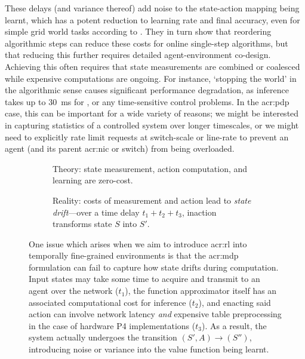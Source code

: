 These delays (and variance thereof) add noise to the state-action mapping being learnt, which has a potent reduction to learning rate and final accuracy, even for simple grid world tasks according to \textcite{DBLP:journals/firai/TravnikMSP18}.
They in turn show that reordering algorithmic steps can reduce these costs for online single-step algorithms, but that reducing this further requires detailed agent-environment co-design.
Achieving this often requires that state measurements are combined or coalesced~\parencite{DBLP:journals/corr/abs-1910-04054,DBLP:journals/tnsm/SimpsonRP20} while expensive computations are ongoing.
For instance, `stopping the world' in the algorithmic sense causes significant performance degradation, as inference takes up to \SI{30}{\milli\second} for \citeauthor{DBLP:journals/corr/abs-1910-04054}, or any time-sensitive control problems.
In the \gls{acr:pdp} case, this can be important for a wide variety of reasons; we might be interested in capturing statistics of a controlled system over longer timescales, or we might need to explicitly rate limit requests at switch-scale or line-rate to prevent an agent (and its parent \gls{acr:nic} or switch) from being overloaded.

\begin{figure}
	\begin{subfigure}{0.45\linewidth}
		\centering
		\resizebox{0.975\linewidth}{!}{\hspace{-0.5em}}
		\caption{Theory: state measurement, action computation, and learning are zero-cost.}
	\end{subfigure}
	\hspace{0.05\linewidth}
	\begin{subfigure}{0.45\linewidth}
		\centering
		\resizebox{0.75\linewidth}{!}{\hspace{-0.5em}}
		\caption{Reality: costs of measurement and action lead to \emph{state drift}---over a time delay $t_1+t_2+t_3$, inaction transforms state $S$ into $S'$.}
	\end{subfigure}
	\caption[Illustrating state slippage in an asynchronous RL agent.]{One issue which arises when we aim to introduce \gls{acr:rl} into temporally fine-grained environments is that the \gls{acr:mdp} formulation can fail to capture how state drifts during computation. Input states may take some time to acquire and transmit to an agent over the network ($t_1$), the function approximator itself has an associated computational cost for inference ($t_2$), and enacting said action can involve network latency \emph{and} expensive table preprocessing in the case of hardware P4 implementations ($t_3$). As a result, the system actually undergoes the transition $(S', A)\rightarrow(S'')$, introducing noise or variance into the value function being learnt. \label{fig:state-slip}}
\end{figure}

